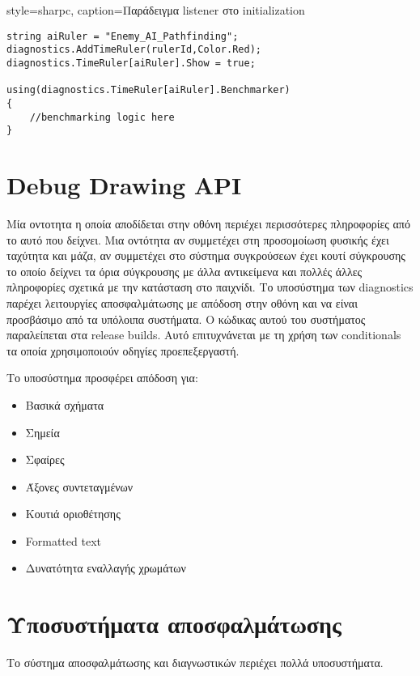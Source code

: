 \lstset
{
	style=sharpc, 
	caption={Παράδειγμα listener στο initialization}
}
\begin{lstlisting}
string aiRuler = "Enemy_AI_Pathfinding";
diagnostics.AddTimeRuler(rulerId,Color.Red);
diagnostics.TimeRuler[aiRuler].Show = true;

using(diagnostics.TimeRuler[aiRuler].Benchmarker)
{
	//benchmarking logic here
}
\end{lstlisting}

\section{Debug Drawing API}
Μία οντοτητα η οποία αποδίδεται στην οθόνη περιέχει περισσότερες πληροφορίες από το αυτό που δείχνει. Μια οντότητα αν συμμετέχει στη προσομοίωση φυσικής έχει ταχύτητα και μάζα, αν συμμετέχει στο σύστημα συγκρούσεων έχει κουτί σύγκρουσης το οποίο δείχνει τα όρια σύγκρουσης με άλλα αντικείμενα και πολλές άλλες πληροφορίες σχετικά με την κατάσταση στο παιχνίδι.
Το υποσύστημα των diagnostics παρέχει λειτουργίες αποσφαλμάτωσης με απόδοση στην οθόνη και να είναι προσβάσιμο από τα υπόλοιπα συστήματα. Ο κώδικας αυτού του συστήματος παραλείπεται στα release builds. Αυτό επιτυχνάνεται με τη χρήση των conditionals τα οποία χρησιμοποιούν οδηγίες προεπεξεργαστή.

Το υποσύστημα προσφέρει απόδοση για:
\begin{itemize}
	\item Βασικά σχήματα
	\item Σημεία
	\item Σφαίρες
	\item Άξονες συντεταγμένων
	\item Κουτιά οριοθέτησης
	\item Formatted text
	\item Δυνατότητα εναλλαγής χρωμάτων
\end{itemize}

\section{Υποσυστήματα αποσφαλμάτωσης}
Το σύστημα αποσφαλμάτωσης και διαγνωστικών περιέχει πολλά υποσυστήματα.

